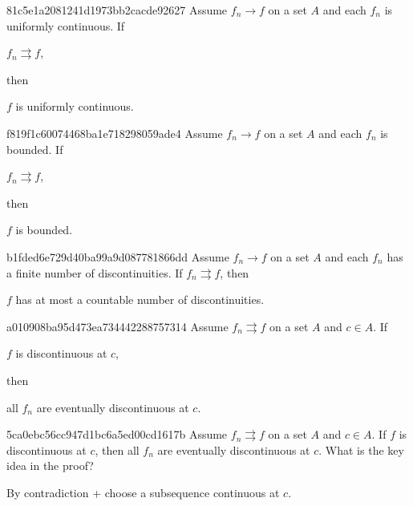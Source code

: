 \begin{note}{81c5e1a2081241d1973bb2cacde92627}
    Assume \({ f_n \to f }\) on a set \({ A }\) and each \({ f_n }\) is uniformly continuous.
    If \begin{icloze}{2}\({ f_n \rightrightarrows f }\),\end{icloze} then \begin{icloze}{1}\({ f }\) is uniformly continuous.\end{icloze}
\end{note}

\begin{note}{f819f1c60074468ba1e718298059ade4}
    Assume \({ f_n \to f }\) on a set \({ A }\) and each \({ f_n }\) is bounded.
    If \begin{icloze}{2}\({ f_n \rightrightarrows f }\),\end{icloze} then \begin{icloze}{1}\({ f }\) is bounded.\end{icloze}
\end{note}

\begin{note}{b1fded6e729d40ba99a9d087781866dd}
    Assume \({ f_n \to f }\) on a set \({ A }\) and each \({ f_n }\) has a finite number of discontinuities.
    If \({ f_n \rightrightarrows f }\), then \begin{icloze}{1}\({ f }\) has at most a countable number of discontinuities.\end{icloze}
\end{note}

\begin{note}{a010908ba95d473ea734442288757314}
    Assume \({ f_n \rightrightarrows f }\) on a set \({ A }\) and \({ c \in A }\).
    If \begin{icloze}{2}\({ f }\) is discontinuous at \({ c }\),\end{icloze} then \begin{icloze}{1}all \({ f_n }\) are eventually discontinuous at \({ c }\).\end{icloze}
\end{note}

\begin{note}{5ca0ebc56cc947d1bc6a5ed00cd1617b}
    Assume \({ f_n \rightrightarrows f }\) on a set \({ A }\) and \({ c \in A }\).
    If \({ f }\) is discontinuous at \({ c }\), then all \({ f_n }\) are eventually discontinuous at \({ c }\).
    What is the key idea in the proof?

    \begin{cloze}{1}
        By contradiction + choose a subsequence continuous at \({ c }\).
    \end{cloze}
\end{note}

